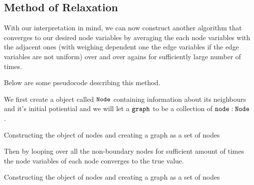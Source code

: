 \documentclass[]{article}
\begin{document}
\subsection{Method of Relaxation}\label{method-of-relaxation}

With our interpretation in mind, we can now construct another algorithm
that converges to our desired node variables by averaging the each node
variables with the adjacent ones (with weighing dependent one the edge
variables if the edge variables are not uniform) over and over agains
for sufficiently large number of times.

Below are some pseudocode describing this method.

We first create a object called \(\tt{Node}\) containing information
about its neighbours and it's initial potiential and we will let a
\(\tt{graph}\) to be a collection of \(\tt{node : Node}\).

\begin{algorithm}[H]
  \SetAlgoLined

  
  \;
 \caption{Constructing the object of nodes and creating a graph as a set of nodes}
\end{algorithm}

Then by looping over all the non-boundary nodes for sufficient amount of
times the node variables of each node converges to the true value.

\begin{algorithm}[H]
  \SetAlgoLined
  
 \caption{Constructing the object of nodes and creating a graph as a set of nodes}
\end{algorithm}
\end{document}
